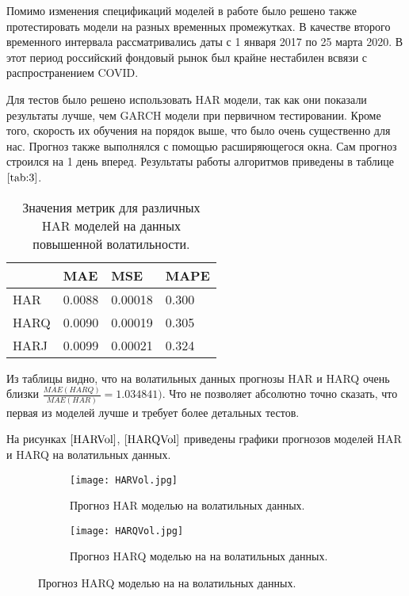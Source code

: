 \documentclass[]{article}
\begin{document}
Помимо изменения спецификаций моделей в работе было решено также протестировать модели на разных временных промежутках. В качестве второго временного интервала рассматривались даты с 1 января 2017 по 25 марта 2020. В этот период российский фондовый рынок был крайне нестабилен всвязи с распространением COVID. 

Для тестов было решено использовать HAR модели, так как они показали результаты лучше, чем GARCH модели при первичном тестировании. Кроме того, скорость их обучения на порядок выше, что было очень существенно для нас. Прогноз также выполнялся с помощью расширяющегося окна. Сам прогноз строился на 1 день вперед. Результаты работы алгоритмов приведены в таблице $\ref{tab:3}$.


\begin{table}[h!]
	\centering
	\caption{Значения метрик для различных HAR моделей на данных повышенной волатильности.}
	\begin{tabularx}{\textwidth}{|X|X|X|X|}
		\hline
		       &   MAE   & MSE      & MAPE     \\ \hline
		HAR    & 0.0088  & 0.00018  & 0.300    \\ \hline
		HARQ   & 0.0090  & 0.00019  & 0.305    \\ \hline
		HARJ   & 0.0099  & 0.00021  & 0.324    \\ \hline
	\end{tabularx}
	\label{tab:3}
\end{table}

Из таблицы видно, что на волатильных данных прогнозы HAR и HARQ очень близки $\frac{MAE(HARQ)}{MAE(HAR)} = 1.034841)$. Что не позволяет абсолютно точно сказать, что первая из моделей лучше и требует более детальных тестов.

На рисунках $\ref{HARVol}$, $\ref{HARQVol}$ приведены графики прогнозов моделей HAR и HARQ на волатильных данных. 


\begin{figure}[h!]
	\centering
	\begin{subfigure}{0.49\textwidth}
		\texttt{[image: HARVol.jpg]}
		\caption{Прогноз HAR моделью на волатильных данных.}
		\label{HARVol}
	\end{subfigure}
	\hfill
	\begin{subfigure}{0.49\textwidth}
		\texttt{[image: HARQVol.jpg]}
		\caption{Прогноз HARQ моделью на на волатильных данных.}
		\label{HARQVol}
	\end{subfigure}
\end{figure}
\end{document}

